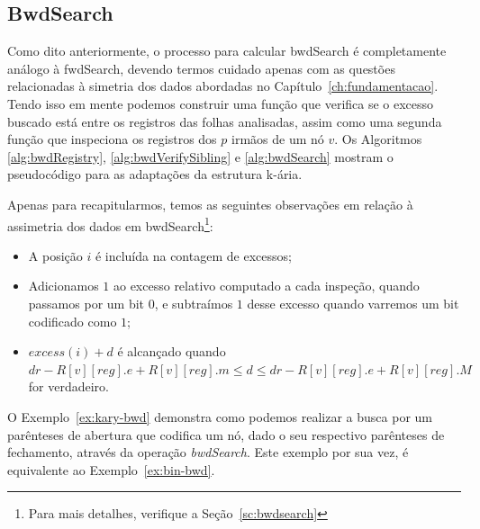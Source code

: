 \newpage
         
\subsection{BwdSearch}\label{sec:bwdSearch}
Como dito anteriormente, o processo para calcular bwdSearch é completamente análogo à fwdSearch, devendo termos cuidado apenas com as questões relacionadas à simetria dos dados abordadas no Capítulo~\ref{ch:fundamentacao}. Tendo isso em mente podemos construir uma função que verifica se o excesso buscado está entre os registros das folhas analisadas, assim como uma segunda função que inspeciona os registros dos $p$ irmãos de um nó $v$. Os Algoritmos \ref{alg:bwdRegistry}, \ref{alg:bwdVerifySibling} e \ref{alg:bwdSearch} mostram o pseudocódigo para as adaptações da estrutura k-ária.


Apenas para recapitularmos, temos as seguintes observações em relação à assimetria dos dados em  bwdSearch\footnote{Para mais detalhes, verifique a Seção~\ref{sc:bwdsearch}}:
\begin{itemize}
    \item A posição $i$ é incluída na contagem de excessos;
    \item Adicionamos $1$ ao excesso relativo computado a cada inspeção, quando passamos por um bit $0$, e subtraímos $1$ desse excesso quando varremos um bit codificado como $1$;
    \item $excess(i) + d $ é alcançado quando $dr - R[v][reg].e + R[v][reg].m \leq d \leq dr - R[v][reg].e + R[v][reg].M $ for verdadeiro.
\end{itemize}

O Exemplo~\ref{ex:kary-bwd}  demonstra como podemos realizar a busca por um parênteses de abertura que codifica um nó, dado o seu respectivo parênteses de fechamento, através da operação \textit{bwdSearch}. Este exemplo por sua vez, é equivalente ao Exemplo~\ref{ex:bin-bwd}.

